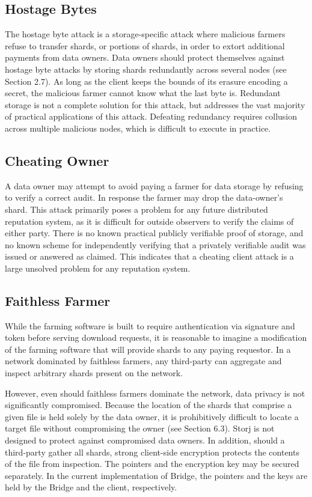 \documentclass[a4paper,10pt]{article}
\begin{document}
\subsection{Hostage Bytes}
The hostage byte attack is a storage-specific attack where malicious farmers
refuse to transfer shards, or portions of shards, in order to extort additional
payments from data owners. Data owners should protect themselves against hostage
byte attacks by storing shards redundantly across several nodes (see Section
2.7). As long as the client keeps the bounds of its erasure encoding a secret,
the malicious farmer cannot know what the last byte is. Redundant storage is not
a complete solution for this attack, but addresses the vast majority of
practical applications of this attack. Defeating redundancy requires collusion
across multiple malicious nodes, which is difficult to execute in practice.

\subsection{Cheating Owner}
A data owner may attempt to avoid paying a farmer for data storage by refusing
to verify a correct audit. In response the farmer may drop the data-owner’s
shard. This attack primarily poses a problem for any future distributed
reputation system, as it is difficult for outside observers to verify the claims
of either party. There is no known practical publicly verifiable proof of
storage, and no known scheme for independently verifying that a privately
verifiable audit was issued or answered as claimed. This indicates that a
cheating client attack is a large unsolved problem for any reputation system.

\subsection{Faithless Farmer}
While the farming software is built to require authentication via signature and
token before serving download requests, it is reasonable to imagine a
modification of the farming software that will provide shards to any paying
requestor. In a network dominated by faithless farmers, any third-party can
aggregate and inspect arbitrary shards present on the network.

However, even should faithless farmers dominate the network, data privacy is not
significantly compromised. Because the location of the shards that comprise a
given file is held solely by the data owner, it is prohibitively difficult to
locate a target file without compromising the owner (see Section 6.3). Storj is
not designed to protect against compromised data owners. In addition, should a
third-party gather all shards, strong client-side encryption protects the
contents of the file from inspection. The pointers and the encryption key may be
secured separately. In the current implementation of Bridge, the pointers and
the keys are held by the Bridge and the client, respectively.
\end{document}
